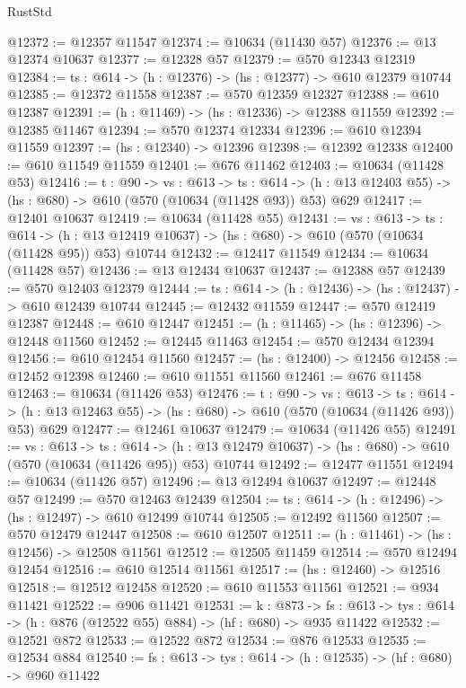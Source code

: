 \begin{lexlean}{RustStd}
\begin{coremodule}
@12372 := @12357 @11547
@12374 := @10634 (@11430 @57)
@12376 := @13 @12374 @10637
@12377 := @12328 @57
@12379 := @570 @12343 @12319
@12384 := {ts : @614} -> (h : @12376) -> (hs : @12377) -> @610 @12379 @10744
@12385 := @12372 @11558
@12387 := @570 @12359 @12327
@12388 := @610 @12387
@12391 := (h : @11469) -> (hs : @12336) -> @12388 @11559
@12392 := @12385 @11467
@12394 := @570 @12374 @12334
@12396 := @610 @12394 @11559
@12397 := (hs : @12340) -> @12396
@12398 := @12392 @12338
@12400 := @610 @11549 @11559
@12401 := @676 @11462
@12403 := @10634 (@11428 @53)
@12416 := {t : @90} ->
  {vs : @613} ->
  {ts : @614} -> (h : @13 @12403 @55) -> (hs : @680) -> @610 (@570 (@10634 (@11428 @93)) @53) @629
@12417 := @12401 @10637
@12419 := @10634 (@11428 @55)
@12431 := {vs : @613} ->
  {ts : @614} ->
  (h : @13 @12419 @10637) -> (hs : @680) -> @610 (@570 (@10634 (@11428 @95)) @53) @10744
@12432 := @12417 @11549
@12434 := @10634 (@11428 @57)
@12436 := @13 @12434 @10637
@12437 := @12388 @57
@12439 := @570 @12403 @12379
@12444 := {ts : @614} -> (h : @12436) -> (hs : @12437) -> @610 @12439 @10744
@12445 := @12432 @11559
@12447 := @570 @12419 @12387
@12448 := @610 @12447
@12451 := (h : @11465) -> (hs : @12396) -> @12448 @11560
@12452 := @12445 @11463
@12454 := @570 @12434 @12394
@12456 := @610 @12454 @11560
@12457 := (hs : @12400) -> @12456
@12458 := @12452 @12398
@12460 := @610 @11551 @11560
@12461 := @676 @11458
@12463 := @10634 (@11426 @53)
@12476 := {t : @90} ->
  {vs : @613} ->
  {ts : @614} -> (h : @13 @12463 @55) -> (hs : @680) -> @610 (@570 (@10634 (@11426 @93)) @53) @629
@12477 := @12461 @10637
@12479 := @10634 (@11426 @55)
@12491 := {vs : @613} ->
  {ts : @614} ->
  (h : @13 @12479 @10637) -> (hs : @680) -> @610 (@570 (@10634 (@11426 @95)) @53) @10744
@12492 := @12477 @11551
@12494 := @10634 (@11426 @57)
@12496 := @13 @12494 @10637
@12497 := @12448 @57
@12499 := @570 @12463 @12439
@12504 := {ts : @614} -> (h : @12496) -> (hs : @12497) -> @610 @12499 @10744
@12505 := @12492 @11560
@12507 := @570 @12479 @12447
@12508 := @610 @12507
@12511 := (h : @11461) -> (hs : @12456) -> @12508 @11561
@12512 := @12505 @11459
@12514 := @570 @12494 @12454
@12516 := @610 @12514 @11561
@12517 := (hs : @12460) -> @12516
@12518 := @12512 @12458
@12520 := @610 @11553 @11561
@12521 := @934 @11421
@12522 := @906 @11421
@12531 := {k : @873} ->
  {fs : @613} -> {tys : @614} -> (h : @876 (@12522 @55) @884) -> (hf : @680) -> @935 @11422
@12532 := @12521 @872
@12533 := @12522 @872
@12534 := @876 @12533
@12535 := @12534 @884
@12540 := {fs : @613} -> {tys : @614} -> (h : @12535) -> (hf : @680) -> @960 @11422

\end{coremodule}
\end{lexlean}

